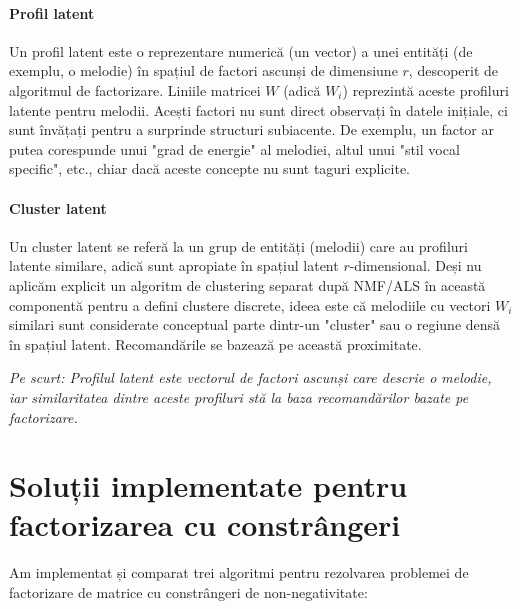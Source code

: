 \documentclass[12pt,a4paper]{article}
\begin{document}
\paragraph{Profil latent}
Un profil latent este o reprezentare numerică (un vector) a unei entități (de exemplu, o melodie) în spațiul de factori ascunși de dimensiune $r$, descoperit de algoritmul de factorizare. Liniile matricei $W$ (adică $W_i$) reprezintă aceste profiluri latente pentru melodii. Acești factori nu sunt direct observați în datele inițiale, ci sunt învățați pentru a surprinde structuri subiacente. De exemplu, un factor ar putea corespunde unui "grad de energie" al melodiei, altul unui "stil vocal specific", etc., chiar dacă aceste concepte nu sunt taguri explicite.

\paragraph{Cluster latent}
Un cluster latent se referă la un grup de entități (melodii) care au profiluri latente similare, adică sunt apropiate în spațiul latent $r$-dimensional. Deși nu aplicăm explicit un algoritm de clustering separat după NMF/ALS în această componentă pentru a defini clustere discrete, ideea este că melodiile cu vectori $W_i$ similari sunt considerate conceptual parte dintr-un "cluster" sau o regiune densă în spațiul latent. Recomandările se bazează pe această proximitate.

\vspace{0.5em}
\textit{Pe scurt: Profilul latent este vectorul de factori ascunși care descrie o melodie, iar similaritatea dintre aceste profiluri stă la baza recomandărilor bazate pe factorizare.}
\vspace{1em} 

\section{Soluții implementate pentru factorizarea cu constrângeri}

Am implementat și comparat trei algoritmi pentru rezolvarea problemei de factorizare de matrice cu constrângeri de non-negativitate:
\end{document}
